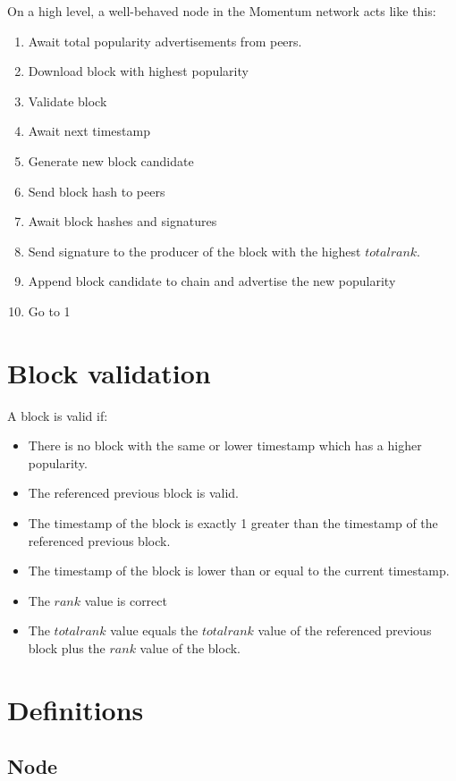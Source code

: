 \documentclass[conference]{IEEEtran}
\begin{document}
On a high level, a well-behaved node in the Momentum network acts like this:

\begin{enumerate}
\item Await total popularity advertisements from peers.
\item Download block with highest popularity
\item Validate block
\item Await next timestamp
\item Generate new block candidate
\item Send block hash to peers
\item Await block hashes and signatures
\item Send signature to the producer of the block with the highest $total rank$.
\item Append block candidate to chain and advertise the new popularity
\item Go to 1
\end{enumerate}

\section{Block validation}

A block is valid if:

\begin{itemize}
\item There is no block with the same or lower timestamp which has a higher popularity.
\item The referenced previous block is valid.
\item The timestamp of the block is exactly 1 greater than the timestamp of the referenced previous block.
\item The timestamp of the block is lower than or equal to the current timestamp.
\item The $rank$ value is correct
\item The $total rank$ value equals the $total rank$ value of the referenced previous block plus the $rank$ value of the block.
\end{itemize}

\section{Definitions}

\subsection{Node}
\end{document}
